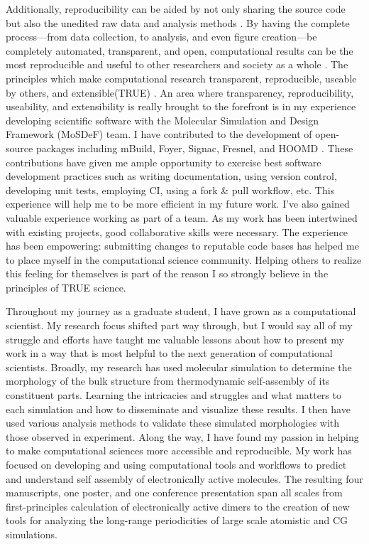 Additionally, reproducibility can be aided by not only sharing the source code but also the unedited raw data and analysis methods \cite{Miyakawa2020}. 
By having the complete process---from data collection, to analysis, and even figure creation---be completely automated, transparent, and open, computational results can be the most reproducible and useful to other researchers and society as a whole \cite{Taylor2019, Donoho2009}.
The principles which make computational research transparent, reproducible, useable by others, and extensible(TRUE) \cite{Thompson2020}.
An area where transparency, reproducibility, useability, and extensibility is really brought to the forefront is in my experience developing scientific software with the Molecular Simulation and Design Framework (MoSDeF) team.
I have contributed to the development of open-source packages including mBuild, Foyer, Signac, Fresnel, and HOOMD \cite{mbuild, foyer, signac, fresnel, hoomd}.
These contributions have given me ample opportunity to exercise best software development practices such as writing documentation, using version control, developing unit tests, employing CI, using a fork \& pull workflow, etc.
This experience will help me to be more efficient in my future work.
I've also gained valuable experience working as part of a team.
As my work has been intertwined with existing projects, good collaborative skills were necessary.
The experience has been empowering: submitting changes to reputable code bases has helped me to place myself in the computational science community.
Helping others to realize this feeling for themselves is part of the reason I so strongly believe in the principles of TRUE science.

Throughout my journey as a graduate student, I have grown as a computational scientist.
My research focus shifted part way through, but I would say all of my struggle and efforts have taught me valuable lessons about how to present my work in a way that is most helpful to the next generation of computational scientists.
Broadly, my research has used molecular simulation to determine the morphology of the bulk structure from thermodynamic self-assembly of its constituent parts. 
Learning the intricacies and struggles and what matters to each simulation and how to disseminate and visualize these results.
I then have used various analysis methods to validate these simulated morphologies with those observed in experiment. 
Along the way, I have found my passion in helping to make computational sciences more accessible and reproducible.
My work has focused on developing and using computational tools and workflows to predict and understand self assembly of electronically active molecules.
The resulting four manuscripts, one poster, and one conference presentation span all scales from first-principles calculation of electronically active dimers to the creation of new tools for analyzing the long-range periodicities of large scale atomistic and CG simulations.

